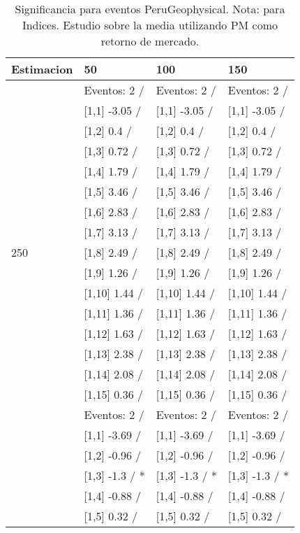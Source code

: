 \begin{table}

\caption{Significancia para eventos PeruGeophysical. Nota: para Indices. Estudio sobre la media utilizando PM como retorno de mercado.}
\centering
\begin{tabular}[t]{llll}
\toprule
Estimacion & 50 & 100 & 150\\
\midrule
 & Eventos:  2 / & Eventos:  2 / & Eventos:  2 /\\
 & {}[1,1] -3.05  / & {}[1,1] -3.05  / & {}[1,1] -3.05  /\\
 & {}[1,2] 0.4  / & {}[1,2] 0.4  / & {}[1,2] 0.4  /\\
 & {}[1,3] 0.72  / & {}[1,3] 0.72  / & {}[1,3] 0.72  /\\
 & {}[1,4] 1.79  / & {}[1,4] 1.79  / & {}[1,4] 1.79  /\\
\addlinespace
 & {}[1,5] 3.46  / & {}[1,5] 3.46  / & {}[1,5] 3.46  /\\
 & {}[1,6] 2.83  / & {}[1,6] 2.83  / & {}[1,6] 2.83  /\\
 & {}[1,7] 3.13  / & {}[1,7] 3.13  / & {}[1,7] 3.13  /\\
250 & {}[1,8] 2.49  / & {}[1,8] 2.49  / & {}[1,8] 2.49  /\\
 & {}[1,9] 1.26  / & {}[1,9] 1.26  / & {}[1,9] 1.26  /\\
\addlinespace
 & {}[1,10] 1.44  / & {}[1,10] 1.44  / & {}[1,10] 1.44  /\\
 & {}[1,11] 1.36  / & {}[1,11] 1.36  / & {}[1,11] 1.36  /\\
 & {}[1,12] 1.63  / & {}[1,12] 1.63  / & {}[1,12] 1.63  /\\
 & {}[1,13] 2.38  / & {}[1,13] 2.38  / & {}[1,13] 2.38  /\\
 & {}[1,14] 2.08  / & {}[1,14] 2.08  / & {}[1,14] 2.08  /\\
\addlinespace
 & {}[1,15] 0.36  / & {}[1,15] 0.36  / & {}[1,15] 0.36  /\\
 & Eventos:  2 / & Eventos:  2 / & Eventos:  2 /\\
 & {}[1,1] -3.69  / & {}[1,1] -3.69  / & {}[1,1] -3.69  /\\
 & {}[1,2] -0.96  / & {}[1,2] -0.96  / & {}[1,2] -0.96  /\\
 & {}[1,3] -1.3  / * & {}[1,3] -1.3  / * & {}[1,3] -1.3  / *\\
\addlinespace
 & {}[1,4] -0.88  / & {}[1,4] -0.88  / & {}[1,4] -0.88  /\\
 & {}[1,5] 0.32  / & {}[1,5] 0.32  / & {}[1,5] 0.32  /\\

\end{tabular}
\end{table}

